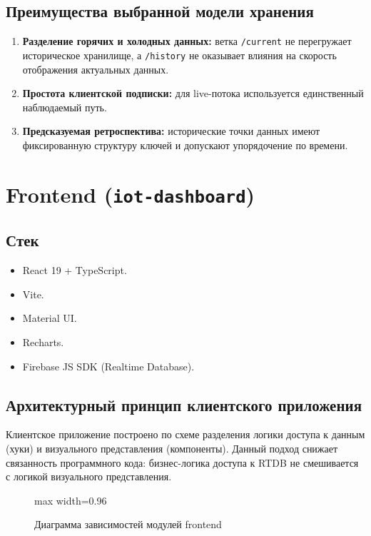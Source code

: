 \subsection{Преимущества выбранной модели хранения}

\begin{enumerate}
    \item \textbf{Разделение горячих и холодных данных:} ветка \texttt{/current} не перегружает историческое хранилище, а \texttt{/history} не оказывает влияния на скорость отображения актуальных данных.
    \item \textbf{Простота клиентской подписки:} для live-потока используется единственный наблюдаемый путь.
    \item \textbf{Предсказуемая ретроспектива:} исторические точки данных имеют фиксированную структуру ключей и допускают упорядочение по времени.
\end{enumerate}

\section{Frontend (\texttt{iot-dashboard})}

\subsection{Стек}

\begin{itemize}
    \item React 19 + TypeScript.
    \item Vite.
    \item Material UI.
    \item Recharts.
    \item Firebase JS SDK (Realtime Database).
\end{itemize}

\subsection{Архитектурный принцип клиентского приложения}

Клиентское приложение построено по схеме разделения логики доступа к данным (хуки) и визуального представления (компоненты). Данный подход снижает связанность программного кода: бизнес-логика доступа к RTDB не смешивается с логикой визуального представления.

\begin{figure}[htbp]
\centering
\begin{adjustbox}{max width=0.96\textwidth}

\end{adjustbox}
\caption{Диаграмма зависимостей модулей frontend}
\end{figure}

